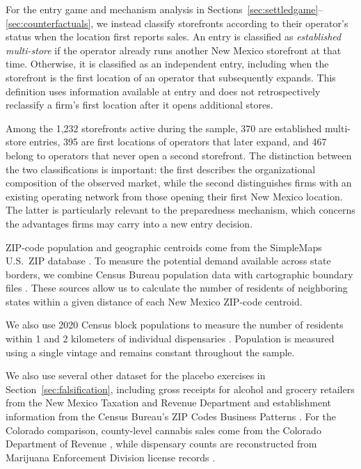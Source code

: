 \documentclass[english,12pt]{article}
\begin{document}
For the entry game and mechanism analysis in Sections~\ref{sec:settledgame}--\ref{sec:counterfactuals}, we instead classify storefronts according to their operator's status when the location first reports sales. An entry is classified as \emph{established multi-store} if the operator already runs another New Mexico storefront at that time. Otherwise, it is classified as an independent entry, including when the storefront is the first location of an operator that subsequently expands. This definition uses information available at entry and does not retrospectively reclassify a firm's first location after it opens additional stores.

Among the 1,232 storefronts active during the sample, 370 are established multi-store entries, 395 are first locations of operators that later expand, and 467 belong to operators that never open a second storefront. The distinction between the two classifications is important: the first describes the organizational composition of the observed market, while the second distinguishes firms with an existing operating network from those opening their first New Mexico location. The latter is particularly relevant to the preparedness mechanism, which concerns the advantages firms may carry into a new entry decision.


ZIP-code population and geographic centroids come from the SimpleMaps U.S.\ ZIP database \citep{SimpleMapsZIP}. To measure the potential demand available across state borders, we combine Census Bureau population data \citep{CensusPopEst2023,CensusBlocks2020} with cartographic boundary files \citep{CensusCountyShapefile}. These sources allow us to calculate the number of residents of neighboring states within a given distance of each New Mexico ZIP-code centroid.

We also use 2020 Census block populations to measure the number of residents within 1 and 2 kilometers of individual dispensaries \citep{CensusBlocks2020}. Population is measured using a single vintage and remains constant throughout the sample.


We also use several other dataset for the placebo exercises in Section~\ref{sec:falsification}, including gross receipts for alcohol and grocery retailers from the New Mexico Taxation and Revenue Department \citep{NMTRDGrossReceipts} and establishment information from the Census Bureau's ZIP Codes Business Patterns \citep{CensusZBP}. For the Colorado comparison, county-level cannabis sales come from the Colorado Department of Revenue \citep{COMarijuanaSalesByCounty}, while dispensary counts are reconstructed from Marijuana Enforcement Division license records \citep{COMedLicensees}.
\end{document}
